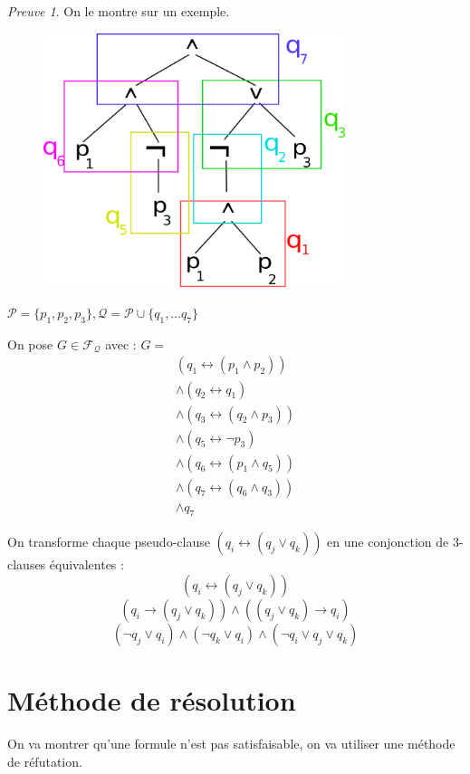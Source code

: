 \documentclass[]{article}
\theoremstyle{remark}
\newtheorem{myproof}{Preuve}
\theoremstyle{definition}
\begin{document}
\newpage

\begin{myproof}
	On le montre sur un exemple.
	
	\begin{figure}[!h]
		\centering
		\includegraphics[width=250pt]{arbre_3_FND}
	\end{figure}
	
	$\mathcal{P}=\{p_1, p_2, p_3\}, \mathcal{Q}=\mathcal{P} \cup \{q_1, ... q_7\}$
	
	On pose $G \in \mathcal{F}_{\mathcal{Q}}$ avec : $G=$
	$$\begin{array}{l}
	(q_1 \leftrightarrow (p_1 \land p_2)) \\
	\land (q_2 \leftrightarrow q_1)\\
	\land (q_3 \leftrightarrow (q_2 \land p_3))\\
	\land (q_5 \leftrightarrow \neg p_3)\\
	\land (q_6 \leftrightarrow (p_1 \land q_5))\\
	\land (q_7 \leftrightarrow (q_6 \land q_3))\\
	\land q_7
	\end{array}
	$$
	
	On transforme chaque pseudo-clause $(q_i \leftrightarrow (q_j \lor q_k))$ en une conjonction de 3-clauses équivalentes :
	$$(q_i \leftrightarrow (q_j \lor q_k))$$
	$$(q_i \rightarrow (q_j \lor q_k))\land((q_j \lor q_k) \rightarrow q_i)$$
	$$(\neg q_j \lor q_i)\land (\neg q_k \lor q_i)\land(\neg q_i \lor q_j \lor q_k)$$
\end{myproof}

\section{Méthode de résolution}

On va montrer qu'une formule n'est pas satisfaisable, on va utiliser une méthode de réfutation.
\end{document}
